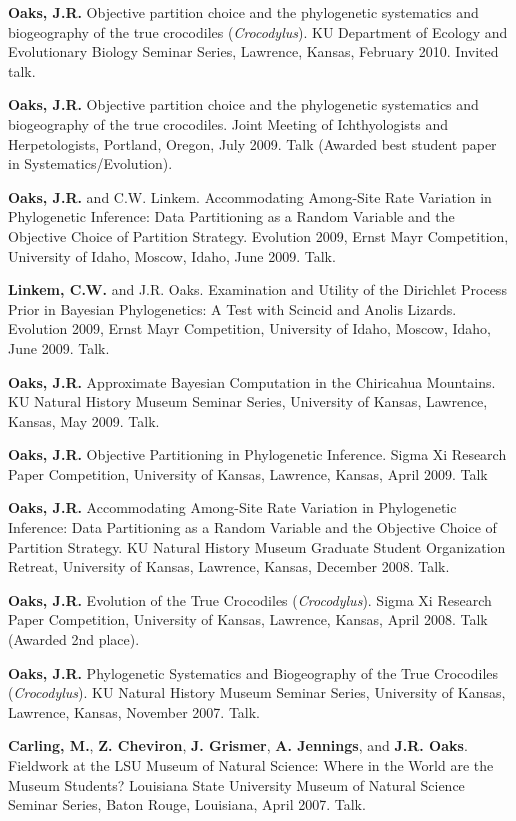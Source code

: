 \documentclass[10pt]{article}
\newcommand{\myHangIndent}{\hangindent=5mm}
\begin{document}
\myHangIndent
{\bf Oaks, J.R.}
Objective partition choice and the phylogenetic systematics and biogeography of
the true crocodiles (\emph{Crocodylus}).
KU Department of Ecology and Evolutionary Biology Seminar Series, Lawrence,
Kansas, February 2010.
Invited talk.

\myHangIndent
{\bf Oaks, J.R.}
Objective partition choice and the phylogenetic systematics and biogeography of
the true crocodiles.
Joint Meeting of Ichthyologists and Herpetologists, Portland, Oregon, July
2009.
Talk (Awarded best student paper in Systematics/Evolution).

\myHangIndent
{\bf Oaks, J.R.} and C.W. Linkem.
Accommodating Among-Site Rate Variation in Phylogenetic Inference: Data
Partitioning as a Random Variable and the Objective Choice of Partition
Strategy.
Evolution 2009, Ernst Mayr Competition, University of Idaho, Moscow, Idaho,
June 2009.
Talk.

\myHangIndent
{\bf Linkem, C.W.} and J.R. Oaks.
Examination and Utility of the Dirichlet Process Prior in Bayesian
Phylogenetics: A Test with Scincid and Anolis Lizards.
Evolution 2009, Ernst Mayr Competition, University of Idaho, Moscow, Idaho,
June 2009.
Talk.

\myHangIndent
{\bf Oaks, J.R.}
Approximate Bayesian Computation in the Chiricahua Mountains.
KU Natural History Museum Seminar Series, University of Kansas, Lawrence,
Kansas, May 2009.
Talk.

\myHangIndent
{\bf Oaks, J.R.}
Objective Partitioning in Phylogenetic Inference.
Sigma Xi Research Paper Competition, University of Kansas, Lawrence, Kansas,
April 2009.
Talk

\myHangIndent
{\bf Oaks, J.R.}
Accommodating Among-Site Rate Variation in Phylogenetic Inference: Data
Partitioning as a Random Variable and the Objective Choice of Partition
Strategy.
KU Natural History Museum Graduate Student Organization Retreat, University of
Kansas, Lawrence, Kansas, December 2008.
Talk.

\myHangIndent
{\bf Oaks, J.R.}
Evolution of the True Crocodiles (\emph{Crocodylus}).
Sigma Xi Research Paper Competition, University of Kansas, Lawrence, Kansas, April 2008.
Talk (Awarded 2nd place).

\myHangIndent
{\bf Oaks, J.R.}
Phylogenetic Systematics and Biogeography of the True Crocodiles
(\emph{Crocodylus}).
KU Natural History Museum Seminar Series, University of Kansas, Lawrence,
Kansas, November 2007.
Talk.

\myHangIndent
{\bf Carling, M.}, {\bf Z. Cheviron}, {\bf J. Grismer}, {\bf A. Jennings}, and
{\bf J.R. Oaks}.
Fieldwork at the LSU Museum of Natural Science: Where in the World are the
Museum Students?
Louisiana State University Museum of Natural Science Seminar Series, Baton
Rouge, Louisiana, April 2007.
Talk.
\end{document}
